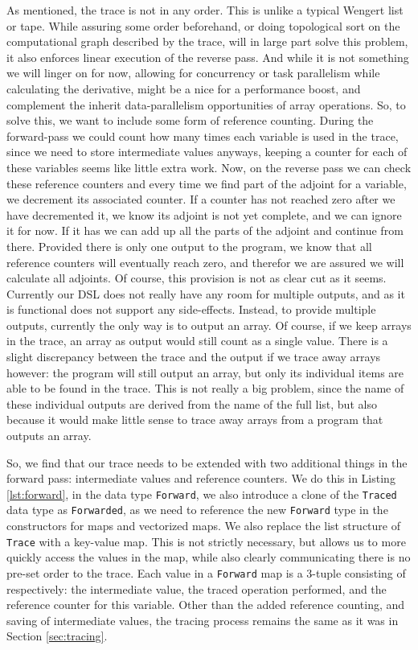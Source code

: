     As mentioned, the trace is not in any order.
    This is unlike a typical Wengert list or tape.
    While assuring some order beforehand, or doing topological sort on the computational graph described by the trace, will in large part solve this problem, it also enforces linear execution of the reverse pass.
    And while it is not something we will linger on for now, allowing for concurrency or task parallelism while calculating the derivative, might be a nice for a performance boost, and complement the inherit data-parallelism opportunities of array operations.
    So, to solve this, we want to include some form of reference counting.
    During the forward-pass we could count how many times each variable is used in the trace, since we need to store intermediate values anyways, keeping a counter for each of these variables seems like little extra work.
    Now, on the reverse pass we can check these reference counters and every time we find part of the adjoint for a variable, we decrement its associated counter.
    If a counter has not reached zero after we have decremented it, we know its adjoint is not yet complete, and we can ignore it for now.
    If it has we can add up all the parts of the adjoint and continue from there.
    Provided there is only one output to the program, we know that all reference counters will eventually reach zero, and therefor we are assured we will calculate all adjoints.
    Of course, this provision is not as clear cut as it seems.
    Currently our DSL does not really have any room for multiple outputs, and as it is functional does not support any side-effects.
    Instead, to provide multiple outputs, currently the only way is to output an array.
    Of course, if we keep arrays in the trace, an array as output would still count as a single value.
    There is a slight discrepancy between the trace and the output if we trace away arrays however: the program will still output an array, but only its individual items are able to be found in the trace.
    This is not really a big problem, since the name of these individual outputs are derived from the name of the full list, but also because it would make little sense to trace away arrays from a program that outputs an array.

    So, we find that our trace needs to be extended with two additional things in the forward pass: intermediate values and reference counters.
    We do this in Listing \ref{lst:forward}, in the data type \texttt{Forward}, we also introduce a clone of the \texttt{Traced} data type as \texttt{Forwarded}, as we need to reference the new \texttt{Forward} type in the constructors for maps and vectorized maps.
    We also replace the list structure of \texttt{Trace} with a key-value map.
    This is not strictly necessary, but allows us to more quickly access the values in the map, while also clearly communicating there is no pre-set order to the trace.
    Each value in a \texttt{Forward} map is a 3-tuple consisting of respectively: the intermediate value, the traced operation performed, and the reference counter for this variable.
    Other than the added reference counting, and saving of intermediate values, the tracing process remains the same as it was in Section \ref{sec:tracing}.

